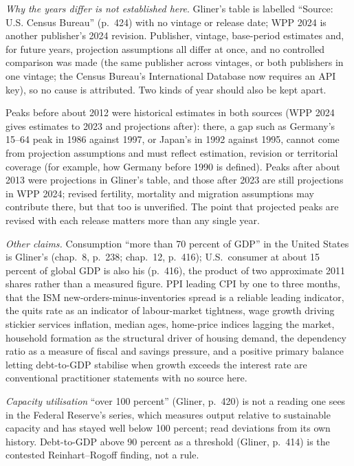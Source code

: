 \begin{qfdefinition}
\emph{Why the years differ is not established here}. Gliner's table is labelled ``Source: U.S. Census Bureau'' (p.~424) with no vintage or release date; WPP 2024 is another publisher's 2024 revision. Publisher, vintage, base-period estimates and, for future years, projection assumptions all differ at once, and no controlled comparison was made (the same publisher across vintages, or both publishers in one vintage; the Census Bureau's International Database now requires an API key), so no cause is attributed. Two kinds of year should also be kept apart.

Peaks before about 2012 were historical estimates in both sources (WPP 2024 gives estimates to 2023 and projections after): there, a gap such as Germany's 15--64 peak in 1986 against 1997, or Japan's in 1992 against 1995, cannot come from projection assumptions and must reflect estimation, revision or territorial coverage (for example, how Germany before 1990 is defined). Peaks after about 2013 were projections in Gliner's table, and those after 2023 are still projections in WPP 2024; revised fertility, mortality and migration assumptions may contribute there, but that too is unverified. The point that projected peaks are revised with each release matters more than any single year.

\emph{Other claims.} Consumption ``more than 70 percent of GDP'' in the United States is Gliner's (chap.~8, p.~238; chap.~12, p.~416); U.S.\ consumer at about 15 percent of global GDP is also his (p.~416), the product of two approximate 2011 shares rather than a measured figure. PPI leading CPI by one to three months, that the ISM new-orders-minus-inventories spread is a reliable leading indicator, the quits rate as an indicator of labour-market tightness, wage growth driving stickier services inflation, median ages, home-price indices lagging the market, household formation as the structural driver of housing demand, the dependency ratio as a measure of fiscal and savings pressure, and a positive primary balance letting debt-to-GDP stabilise when growth exceeds the interest rate are conventional practitioner statements with no source here.

 \emph{Capacity utilisation} ``over 100 percent'' (Gliner, p.~420) is not a reading one sees in the Federal Reserve's series, which measures output relative to sustainable capacity and has stayed well below 100 percent; read deviations from its own history. Debt-to-GDP above 90 percent as a threshold (Gliner, p.~414) is the contested Reinhart--Rogoff finding, not a rule.


\end{qfdefinition}
